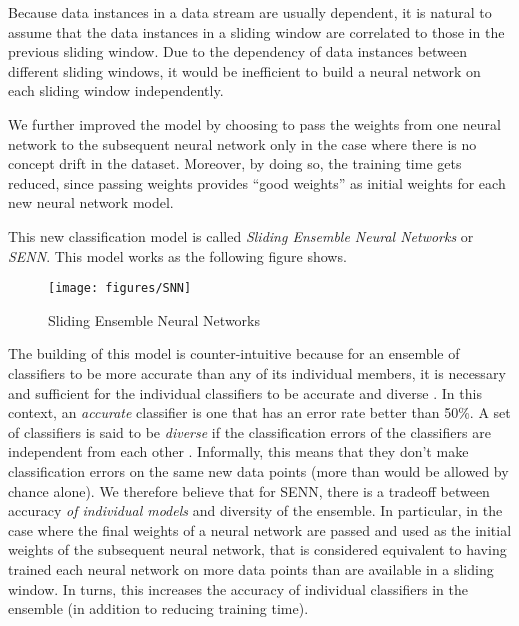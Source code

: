 \documentclass[conference]{IEEEtran}
\begin{document}
		Because data instances in a data stream are usually dependent, it is natural to assume that the data instances in a sliding window are correlated to those in the previous sliding window.  Due to the dependency of data instances between different sliding windows, it would be inefficient to build a neural network on each sliding window independently.   
		
		We further improved the model by choosing to pass the weights from one neural network to the subsequent neural network only in the case where there is no concept drift in the dataset. Moreover, by doing so, the training time gets reduced, since passing weights provides ``good weights'' as  initial weights for each new neural network model.
		
		This new classification model is called \emph{Sliding Ensemble Neural Networks} or \emph{SENN}. This model works as the following figure shows.
		
		
		\begin{figure}[H]
			\centering
			\texttt{[image: figures/SNN]}
			\caption{Sliding Ensemble Neural Networks}
			\label{fig:SNN}
		\end{figure}
		
		The building of this model is counter-intuitive because for an ensemble of classifiers to be more accurate than any of its individual members, it is necessary and sufficient for the individual classifiers to be accurate and diverse \cite{Hansen}. In this context, an \emph{accurate} classifier is one that has an error rate better than 50\%. A set of classifiers is said to be \emph{diverse} if the classification errors of the classifiers are independent from each other \cite{Dietterich}. Informally, this means that they don't make classification errors on the same new data points (more than would be allowed by chance alone). We therefore believe that for SENN, there is a tradeoff between accuracy \emph{of individual models} and diversity of the ensemble. In particular, in the case where the final weights of a neural network are passed and used as the initial weights of the subsequent neural network, that is considered equivalent to having trained each neural network on more data points than are available in a sliding window. In turns, this increases the accuracy of individual classifiers in the ensemble (in addition to reducing training time). 
		
\end{document}
